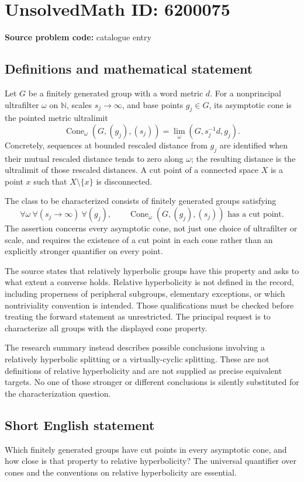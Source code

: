 \documentclass[11pt]{article}
\newcommand{\N}{\mathbb{N}}
\begin{document}
\section*{UnsolvedMath ID: 6200075}
\textbf{Source problem code:} catalogue entry
\subsection{Definitions and mathematical statement}
Let $G$ be a finitely generated group with a word metric $d$. For a nonprincipal ultrafilter $\omega$ on $\N$, scales $s_j\to\infty$, and base points $g_j\in G$, its asymptotic cone is the pointed metric ultralimit
\[
 \operatorname{Cone}_\omega(G,(g_j),(s_j))
       =\lim_\omega(G,s_j^{-1}d,g_j).
\]
Concretely, sequences at bounded rescaled distance from $g_j$ are identified when their mutual rescaled distance tends to zero along $\omega$; the resulting distance is the ultralimit of those rescaled distances. A cut point of a connected space $X$ is a point $x$ such that $X\setminus\{x\}$ is disconnected.

The class to be characterized consists of finitely generated groups satisfying
\[
 \forall\omega\ \forall(s_j\to\infty)\ \forall(g_j),\qquad
 \operatorname{Cone}_\omega(G,(g_j),(s_j))
       \text{ has a cut point}.
\]
The assertion concerns every asymptotic cone, not just one choice of ultrafilter or scale, and requires the existence of a cut point in each cone rather than an explicitly stronger quantifier on every point.

The source states that relatively hyperbolic groups have this property and asks to what extent a converse holds. Relative hyperbolicity is not defined in the record, including properness of peripheral subgroups, elementary exceptions, or which nontriviality convention is intended. Those qualifications must be checked before treating the forward statement as unrestricted. The principal request is to characterize all groups with the displayed cone property.

The research summary instead describes possible conclusions involving a relatively hyperbolic splitting or a virtually-cyclic splitting. These are not definitions of relative hyperbolicity and are not supplied as precise equivalent targets. No one of those stronger or different conclusions is silently substituted for the characterization question.
\subsection{Short English statement}
Which finitely generated groups have cut points in every asymptotic cone, and how close is that property to relative hyperbolicity? The universal quantifier over cones and the conventions on relative hyperbolicity are essential.
\end{document}

